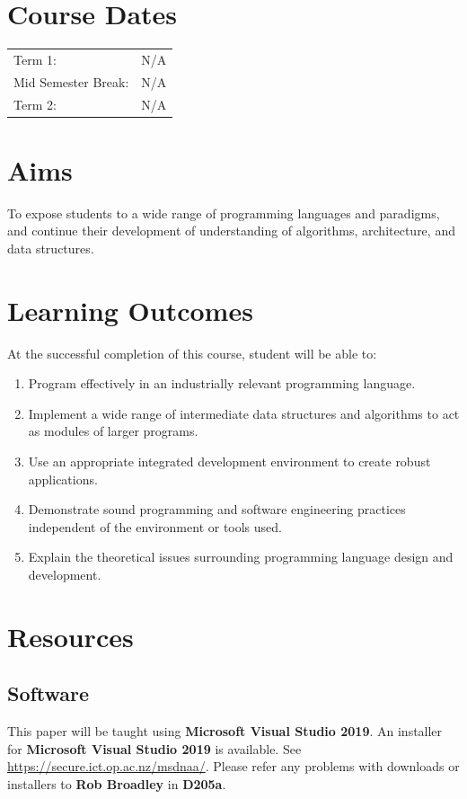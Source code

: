 \documentclass{article}
\begin{document}
\section*{Course Dates}
\begin{tabular}{ll}
	Term 1:             & N/A \\
	Mid Semester Break: & N/A \\
	Term 2:             & N/A \\
\end{tabular}

\section*{Aims}
To expose students to a wide range of programming languages and paradigms, and continue their development of understanding of algorithms, architecture, and data structures.

\section*{Learning Outcomes}
At the successful completion of this course, student will be able to:
\begin{enumerate}
	\item Program effectively in an industrially relevant programming language.
	\item Implement a wide range of intermediate data structures and algorithms to act as modules of larger programs.
	\item Use an appropriate integrated development environment to create robust applications.
	\item Demonstrate sound programming and software engineering practices independent of the environment or tools used.
	\item Explain the theoretical issues surrounding programming language design and development.
\end{enumerate}

\section*{Resources}

\subsection*{Software}
This paper will be taught using \textbf{Microsoft Visual Studio 2019}. An installer for \textbf{Microsoft Visual Studio 2019} is available. See \href{https://secure.ict.op.ac.nz/msdnaa/}{https://secure.ict.op.ac.nz/msdnaa/}. Please refer any problems with downloads or installers to \textbf{Rob Broadley} in \textbf{D205a}.
\end{document}
